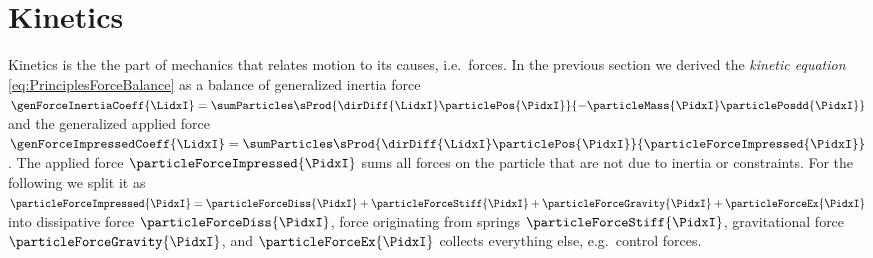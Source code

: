 \section{Kinetics}
Kinetics is the the part of mechanics that relates motion to its causes, i.e.\ forces.%
In the previous section we derived the \textit{kinetic equation} \eqref{eq:PrinciplesForceBalance} as a balance of generalized inertia force $\genForceInertiaCoeff{\LidxI} = \sumParticles \sProd{\dirDiff{\LidxI} \particlePos{\PidxI}}{-\particleMass{\PidxI}\particlePosdd{\PidxI}}$ and the generalized applied force $\genForceImpressedCoeff{\LidxI} = \sumParticles \sProd{\dirDiff{\LidxI} \particlePos{\PidxI}}{\particleForceImpressed{\PidxI}}$.
The applied force $\particleForceImpressed{\PidxI}$ sums all forces on the particle that are not due to inertia or constraints.
For the following we split it as $\particleForceImpressed{\PidxI} = \particleForceDiss{\PidxI} + \particleForceStiff{\PidxI} + \particleForceGravity{\PidxI} + \particleForceEx{\PidxI}$ into dissipative force $\particleForceDiss{\PidxI}$, force originating from springs $\particleForceStiff{\PidxI}$, gravitational force $\particleForceGravity{\PidxI}$, and $\particleForceEx{\PidxI}$ collects everything else, e.g.\ control forces.

